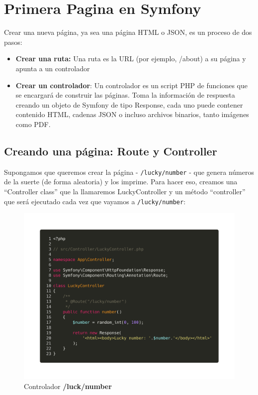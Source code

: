 \section{Primera Pagina en Symfony}
Crear una nueva página, ya sea una página HTML o JSON, es un proceso de dos pasos:
\begin{itemize}
  \item \textbf{Crear una ruta:} Una ruta es la URL (por ejemplo, /about) a su página y apunta a un controlador
  \item \textbf{Crear un controlador}: Un controlador es un script PHP de funciones que se encargará de construir las páginas. Toma la información de respuesta creando un objeto de Symfony de tipo Response, cada uno puede contener contenido HTML, cadenas JSON o incluso archivos binarios, tanto imágenes como PDF.
\end{itemize}
\subsection{Creando una página: Route y Controller}
Supongamos que queremos crear la página - \texttt{/lucky/number} - que genera números de la suerte (de forma aleatoria) y los imprime. Para hacer eso, creamos una “Controller class” que la llamaremos LuckyController y un método “controller” que será ejecutado cada vez que vayamos a \texttt{/lucky/number}:


\begin{figure}[ht]
  \centering
  \includegraphics[width=\textwidth]{../assets/lucky_controller.png}
  \caption{Controlador \textbf{/luck/number}}
  \label{fig:lucky_controller}
\end{figure}

